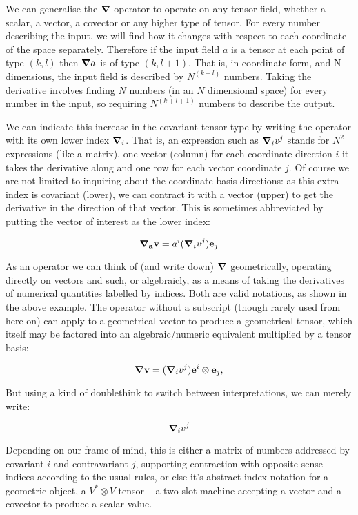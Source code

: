 We can generalise the $\grad$ operator to operate on any tensor field, whether a scalar, a vector, a covector or any higher type of tensor. For every number describing the input, we will find how it changes with respect to each coordinate of the space separately. Therefore if the input field $a$ is a tensor at each point of type $(k, l)$ then $\grad a$ is of type $(k, l + 1)$. That is, in coordinate form, and N dimensions, the input field is described by $N^{(k+l)}$ numbers. Taking the derivative involves finding $N$ numbers (in an $N$ dimensional space) for every number in the input, so requiring $N^{(k+l+1)}$ numbers to describe the output.

We can indicate this increase in the covariant tensor type by writing the operator with its own lower index $\grad_i$. That is, an expression such as $\grad_i v^j$ stands for $N^2$ expressions (like a matrix), one vector (column) for each coordinate direction $i$ it takes the derivative along and one row for each vector coordinate $j$. Of course we are not limited to inquiring about the coordinate basis directions: as this extra index is covariant (lower), we can contract it with a vector (upper) to get the derivative in the direction of that vector. This is sometimes abbreviated by putting the vector of interest as the lower index:

$$
\grad_{\mathbf{a}} \mathbf{v} = a^i (\grad_i v^j) \mathbf{e}_j
$$

As an operator we can think of (and write down) $\grad$ geometrically, operating directly on vectors and such, or algebraicly, as a means of taking the derivatives of numerical quantities labelled by indices. Both are valid notations, as shown in the above example. The operator without a subscript (though rarely used from here on) can apply to a geometrical vector to produce a geometrical tensor, which itself may be factored into an algebraic/numeric equivalent multiplied by a tensor basis:

$$
\grad \mathbf{v} = (\grad_i v^j) \mathbf{e}^i \otimes \mathbf{e}_j,
$$

But using a kind of doublethink to switch between interpretations, we can merely write:

$$
\grad_i v^j
$$

Depending on our frame of mind, this is either a matrix of numbers addressed by covariant $i$ and contravariant $j$, supporting contraction with opposite-sense indices according to the usual rules, or else it's abstract index notation for a geometric object, a $V^* \otimes V$ tensor -- a two-slot machine accepting a vector and a covector to produce a scalar value.

